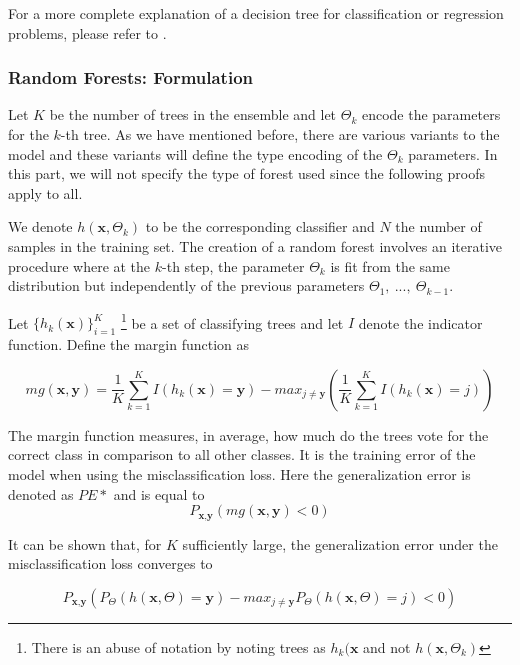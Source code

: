 For a more complete explanation of a decision tree for classification or regression problems, please refer to \textcite{breiman-cart84}.

\textit{}

\subsubsection{ Random Forests: Formulation }


Let $K$  be the number of trees in the ensemble and let $\Theta_k$ encode the parameters for the $k$-th tree. As we have mentioned before, there are various variants to the model and these variants will define the type encoding of the $\Theta_k$ parameters. In this part, we will not specify the type of forest used since the following proofs apply to all.

We denote $h(\textbf{x},\Theta_k)$ to be the corresponding classifier and $N$ the number of samples in the training set. The creation of a random forest involves an iterative procedure where at the $k$-th step, the parameter $\Theta_k$ is fit from the same distribution but independently of the previous parameters $\Theta_1, \ ..., \ \Theta_{k-1}$. %


Let $\{h_k(\textbf{x})\}_{i=1}^K$  \footnote{There is an abuse of notation by noting trees as $h_k(\textbf{x}$ and not $h(\textbf{x}, \Theta_k)$ } be a set of classifying trees and let $I$ denote the indicator function.  Define the margin function as

$$mg(\textbf{x},\textbf{y}) =  \frac{1}{K}   \sum_{k=1}^K I(h_k(\textbf{x}) = \textbf{y})
- max_{j\neq \textbf{y}}\left(\frac{1}{K} \sum_{k=1}^K I(h_k(\textbf{x}) = j) \right) $$ \label{eq:rf-marginFun}


The margin function measures, in average, how much do the trees vote for the correct class in comparison to all other classes. It is the training error of the model when using the misclassification loss. Here the generalization error is denoted as $PE*$ and is equal to  $$P_{\textbf{x}, \textbf{y} }(mg(\textbf{x},\textbf{y}) <0)$$

 It can be shown that, for $K$ sufficiently large, the generalization error under the misclassification loss converges to

$$ P_{\textbf{x}, \textbf{y} } ( P_{\Theta} (h(\textbf{x}, \Theta) = \textbf{y}) - max_{j \neq \textbf{y}} P_{\Theta} (h(\textbf{x}, \Theta) = j) < 0) $$

